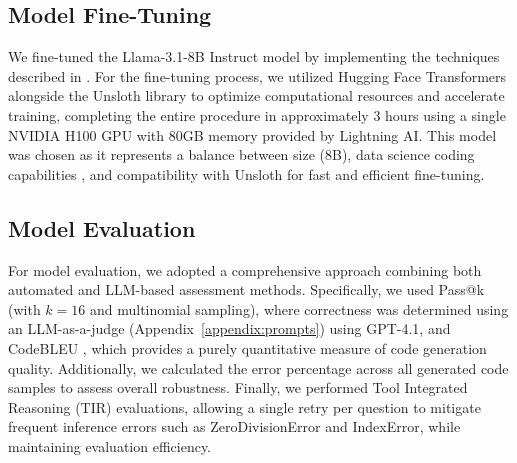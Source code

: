 \subsection{Model Fine-Tuning}

We fine-tuned the Llama-3.1-8B Instruct model \citep{Grattafiori2024Llama3, Unsloth2024WhatModel} by implementing the techniques described in \cite{Pareja2024RecipesSFT}. For the fine-tuning process, we utilized Hugging Face Transformers alongside the Unsloth library to optimize computational resources and accelerate training, completing the entire procedure in approximately 3 hours using a single NVIDIA H100 GPU with 80GB memory provided by Lightning AI. This model was chosen as it represents a balance between size (8B), data science coding capabilities \citep{Lai2022DS1000}, and compatibility with Unsloth for fast and efficient fine-tuning.



\subsection{Model Evaluation}

For model evaluation, we adopted a comprehensive approach combining both automated and LLM-based assessment methods. Specifically, we used Pass@k \citep{Levi2024SimpleModelInferenceScalingLaws} (with $k=16$ and multinomial sampling), where correctness was determined using an LLM-as-a-judge \citep{Li2025LLMJudge} (Appendix~\ref{appendix:prompts}) using GPT-4.1, and CodeBLEU \citep{Ren2020CodeBLEU}, which provides a purely quantitative measure of code generation quality. Additionally, we calculated the error percentage across all generated code samples to assess overall robustness. Finally, we performed Tool Integrated Reasoning (TIR) \citep{Fleureau2024NuminaMath} evaluations, allowing a single retry per question to mitigate frequent inference errors such as ZeroDivisionError and IndexError, while maintaining evaluation efficiency.




